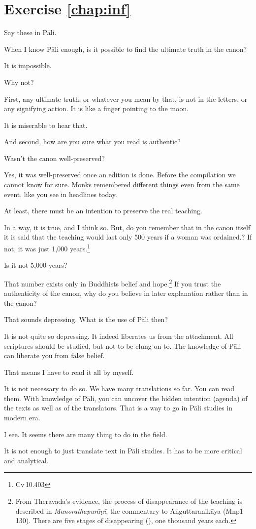 \section*{Exercise \ref{chap:inf}}
Say these in P\=ali.
\begin{compactenum}
\item When I know P\=ali enough, is it possible to find the ultimate truth in the canon?
\item It is impossible.
\item Why not?
\item First, any ultimate truth, or whatever you mean by that, is not in the letters, or any signifying action. It is like a finger pointing to the moon.
\item It is miserable to hear that.
\item And second, how are you sure what you read is authentic?
\item Wasn't the canon well-preserved?
\item Yes, it was well-preserved once an edition is done. Before the compilation we cannot know for sure. Monks remembered different things even from the same event, like you see in headlines today.
\item At least, there must be an intention to preserve the real teaching.
\item In a way, it is true, and I think so. But, do you remember that in the canon itself it is said that the teaching would last only 500 years if a woman was ordained.? If not, it was just 1,000 years.\footnote{Cv\,10.403}
\item Is it not 5,000 years?
\item That number exists only in Buddhists belief and hope.\footnote{From Theravada's evidence, the process of disappearance of the teaching is described in \emph{Manorathapur\=a\d n\=i}, the commentary to A\.nguttaranik\=aya (Mnp1\,130). There are five stages of disappearing (), one thousand years each.} If you trust the authenticity of the canon, why do you believe in later explanation rather than in the canon?
\item That sounds depressing. What is the use of P\=ali then?
\item It is not quite so depressing. It indeed liberates us from the attachment. All scriptures should be studied, but not to be clung on to. The knowledge of P\=ali can liberate you from false belief.
\item That means I have to read it all by myself.
\item It is not necessary to do so. We have many translations so far. You can read them. With knowledge of P\=ali, you can uncover the hidden intention (agenda) of the texts as well as of the translators. That is a way to go in P\=ali studies in modern era.
\item I see. It seems there are many thing to do in the field.
\item It is not enough to just translate text in P\=ali studies. It has to be more critical and analytical.
\end{compactenum}
